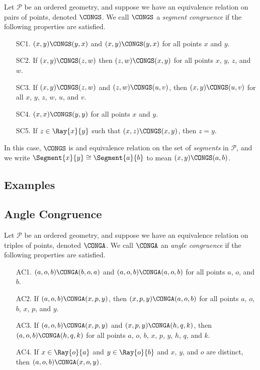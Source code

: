 \documentclass{article}
\begin{document}

\begin{dfn}
Let $\mathcal{P}$ be an ordered geometry, and suppose we have an equivalence relation on pairs of points, denoted $\CONGS$. We call $\CONGS$ a \emph{segment congruence} if the following properties are satisfied.
\begin{itemize}
\item[SC1.] $(x,y) \CONGS (y,x)$ and $(x,y) \CONGS (y,x)$ for all points $x$ and $y$.
\item[SC2.] If $(x,y) \CONGS (z,w)$ then $(z,w) \CONGS (x,y)$ for all points $x$, $y$, $z$, and $w$.
\item[SC3.] If $(x,y) \CONGS (z,w)$ and $(z,w) \CONGS (u,v)$, then $(x,y) \CONGS (u,v)$ for all $x$, $y$, $z$, $w$, $u$, and $v$.
\item[SC4.] $(x,x) \CONGS (y,y)$ for all points $x$ and $y$.
\item[SC5.] If $z \in \Ray{x}{y}$ such that $(x,z) \CONGS (x,y)$, then $z = y$.
\end{itemize}

In this case, $\CONGS$ is and equivalence relation on the set of \emph{segments} in $\mathcal{P}$, and we write $\Segment{x}{y} \cong \Segment{a}{b}$ to mean $(x,y) \CONGS (a,b)$.
\end{dfn}

\subsection*{Examples}


\subsection*{Angle Congruence}

\begin{dfn}
Let $\mathcal{P}$ be an ordered geometry, and suppose we have an equivalence relation on triples of points, denoted $\CONGA$. We call $\CONGA$ an \emph{angle congruence} if the following properties are satisfied.
\begin{itemize}
\item[AC1.] $(a,o,b) \CONGA (b,o,a)$ and $(a,o,b) \CONGA (a,o,b)$ for all points $a$, $o$, and $b$.
\item[AC2.] If $(a,o,b) \CONGA (x,p,y)$, then $(x,p,y) \CONGA (a,o,b)$ for all points $a$, $o$, $b$, $x$, $p$, and $y$.
\item[AC3.] If $(a,o,b) \CONGA (x,p,y)$ and $(x,p,y) \CONGA (h,q,k)$, then $(a,o,b) \CONGA (h,q,k)$ for all points $a$, $o$, $b$, $x$, $p$, $y$, $h$, $q$, and $k$.
\item[AC4.] If $x \in \Ray{o}{a}$ and $y \in \Ray{o}{b}$ and $x$, $y$, and $o$ are distinct, then $(a,o,b) \CONGA (x,o,y)$.
\end{itemize}
\end{dfn}
\end{document}
